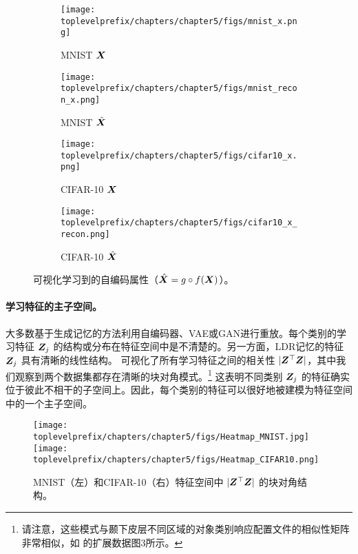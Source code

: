 \documentclass[../../book-main.tex]{subfiles}
\begin{document}
\begin{figure}[t]
    \begin{subfigure}[t]{0.20\textwidth}
        \centering
        \texttt{[image: \\toplevelprefix/chapters/chapter5/figs/mnist\_x.png]}
        \caption{MNIST $\bm{X}$}
    \end{subfigure}
    \hfill
    \begin{subfigure}[t]{0.20\textwidth}
        \centering
        \texttt{[image: \\toplevelprefix/chapters/chapter5/figs/mnist\_recon\_x.png]}
        \caption{MNIST $\hat{\bm{X}}$}
    \end{subfigure}
    \hfill
    \begin{subfigure}[t]{0.20\textwidth}
        \centering
        \texttt{[image: \\toplevelprefix/chapters/chapter5/figs/cifar10\_x.png]}
        \caption{CIFAR-10 $\bm{X}$}
    \end{subfigure}
    \hfill
    \begin{subfigure}[t]{0.20\textwidth}
        \centering
        \texttt{[image: \\toplevelprefix/chapters/chapter5/figs/cifar10\_x\_recon.png]}
        \caption{CIFAR-10 $\hat{\bm{X}}$}
    \end{subfigure}
    \caption{\small 可视化学习到的自编码属性（$\hat{\bm{X}} = g\circ f(\bm{X})$）。}
        \label{fig:justify_xhat_equals_x_incremental}
\end{figure}


\paragraph{学习特征的主子空间。}
大多数基于生成记忆的方法利用自编码器、VAE或GAN进行重放。每个类别的学习特征 $\bm{Z}_j$ 的结构或分布在特征空间中是不清楚的。另一方面，LDR记忆的特征 $\bm{Z}_j$ 具有清晰的线性结构。  可视化了所有学习特征之间的相关性 $|\bm{Z}^\top\bm{Z}|$，其中我们观察到两个数据集都存在清晰的块对角模式。\footnote{请注意，这些模式与颞下皮层不同区域的对象类别响应配置文件的相似性矩阵非常相似，如 \cite{Bao2020AMO} 的扩展数据图3所示。} 这表明不同类别 $\bm{Z}_j$ 的特征确实位于彼此不相干的子空间上。因此，每个类别的特征可以很好地被建模为特征空间中的一个主子空间。

\begin{figure}[tb]
\centering
\texttt{[image: \\toplevelprefix/chapters/chapter5/figs/Heatmap\_MNIST.jpg]}  
\texttt{[image: \\toplevelprefix/chapters/chapter5/figs/Heatmap\_CIFAR10.png]}
\caption{\small MNIST（左）和CIFAR-10（右）特征空间中 $|\bm{Z}^\top \bm{Z}|$ 的块对角结构。}
\label{fig:cifar_10_pca_sampling_main}
\end{figure}
\end{document}
